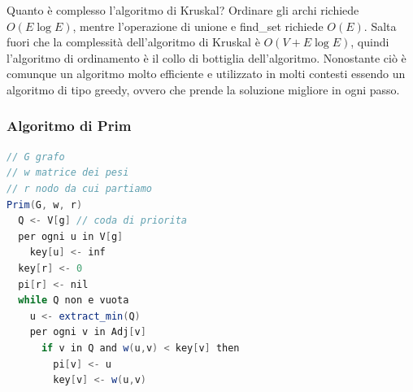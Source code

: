 \documentclass[a4paper]{article}
\begin{document}
Quanto è complesso l'algoritmo di Kruskal?
Ordinare gli archi richiede $O(E \log E)$, mentre l'operazione di unione e find\_set richiede $O(E)$.
Salta fuori che la complessità dell'algoritmo di Kruskal è $O(V + E \log E)$, quindi
l'algoritmo di ordinamento è il collo di bottiglia dell'algoritmo.
Nonostante ciò è comunque un algoritmo molto efficiente e utilizzato in molti contesti essendo 
un algoritmo di tipo greedy, ovvero che prende la soluzione migliore in ogni passo.

\subsubsection{Algoritmo di Prim}
\begin{lstlisting}[language=Scala]
// G grafo
// w matrice dei pesi
// r nodo da cui partiamo
Prim(G, w, r)
  Q <- V[g] // coda di priorita
  per ogni u in V[g]
    key[u] <- inf 
  key[r] <- 0
  pi[r] <- nil
  while Q non e vuota
    u <- extract_min(Q)
    per ogni v in Adj[v]
      if v in Q and w(u,v) < key[v] then
        pi[v] <- u
        key[v] <- w(u,v)
\end{lstlisting}
\end{document}
